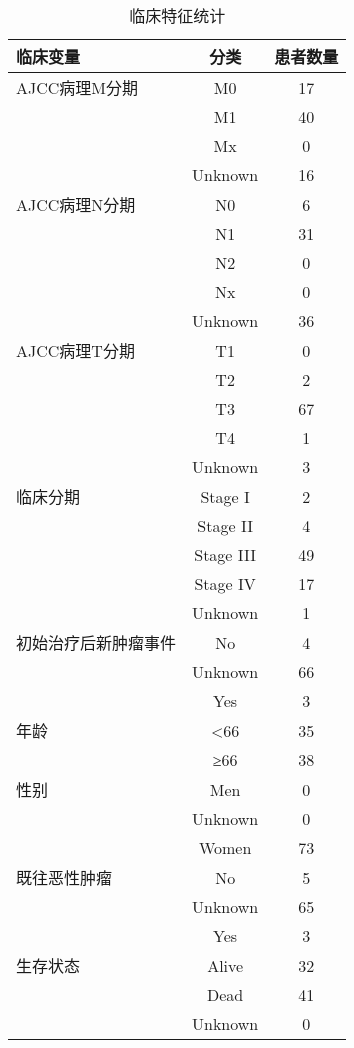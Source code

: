 \begin{table}[htbp]
\centering
\caption{临床特征统计}
\begin{tabular}{lcc}
\hline
临床变量 & 分类 & 患者数量 \\
\hline
AJCC病理M分期 & M0 & 17 \\
 & M1 & 40 \\
 & Mx & 0 \\
 & Unknown & 16 \\
\hline
AJCC病理N分期 & N0 & 6 \\
 & N1 & 31 \\
 & N2 & 0 \\
 & Nx & 0 \\
 & Unknown & 36 \\
\hline
AJCC病理T分期 & T1 & 0 \\
 & T2 & 2 \\
 & T3 & 67 \\
 & T4 & 1 \\
 & Unknown & 3 \\
\hline
临床分期 & Stage I & 2 \\
 & Stage II & 4 \\
 & Stage III & 49 \\
 & Stage IV & 17 \\
 & Unknown & 1 \\
\hline
初始治疗后新肿瘤事件 & No & 4 \\
 & Unknown & 66 \\
 & Yes & 3 \\
\hline
年龄 & <66 & 35 \\
 & ≥66 & 38 \\
\hline
性别 & Men & 0 \\
 & Unknown & 0 \\
 & Women & 73 \\
\hline
既往恶性肿瘤 & No & 5 \\
 & Unknown & 65 \\
 & Yes & 3 \\
\hline
生存状态 & Alive & 32 \\
 & Dead & 41 \\
 & Unknown & 0 \\
\hline
\end{tabular}
\label{tab:clinical_stats}
\end{table}